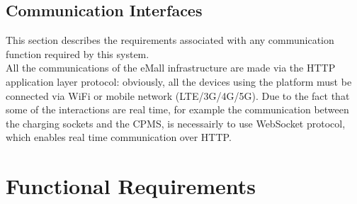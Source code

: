 \subsection{Communication Interfaces}
This section describes the requirements associated with any communication function required by this system.\\
All the communications of the eMall infrastructure are made via the HTTP application layer protocol: obviously, all the devices using the platform must be connected via WiFi or mobile network (LTE/3G/4G/5G). Due to the fact that some of the interactions are real time, for example the communication between the charging sockets and the CPMS, is necessairly to use WebSocket protocol, which enables real time communication over HTTP.
\section{Functional Requirements}
